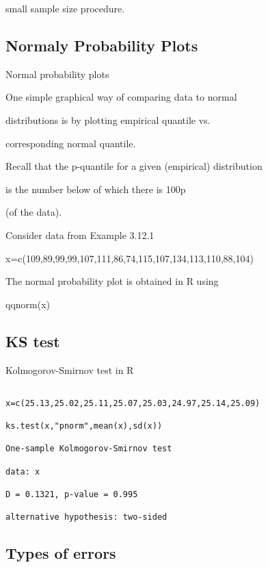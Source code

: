 small sample size procedure.

 

\subsection{Normaly Probability Plots}


Normal probability plots

One simple graphical way of comparing data to normal

distributions is by plotting empirical quantile vs.

corresponding normal quantile.

Recall that the p-quantile for a given (empirical) distribution

is the number below of which there is 100p%

(of the data).

Consider data from Example 3.12.1

x=c(109,89,99,99,107,111,86,74,115,107,134,113,110,88,104)

The normal probability plot is obtained in R using

qqnorm(x)

 


\subsection{KS test}

 


 

Kolmogorov-Smirnov test in R

\begin{verbatim}

x=c(25.13,25.02,25.11,25.07,25.03,24.97,25.14,25.09)

ks.test(x,"pnorm",mean(x),sd(x))

One-sample Kolmogorov-Smirnov test

data: x

D = 0.1321, p-value = 0.995

alternative hypothesis: two-sided

\end{verbatim}

 



\subsection{Types of errors}

